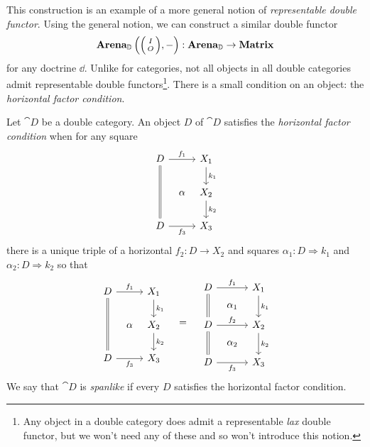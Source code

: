 \documentclass[DynamicalBook]{subfiles}
\begin{document}
This construction is an example of a more general notion of \emph{representable
  double functor}. Using the general notion, we can construct a similar double functor
$$\Cat{Arena}_{\dd}\left( \littlelens{I}{O}, - \right) : \Cat{Arena}_{\dd} \to
\Cat{Matrix}$$
for any doctrine $\dd$.
Unlike for categories, not all objects in all double
categories admit representable double functors\footnote{Any object in a double
  category does admit a representable \emph{lax} double functor, but we won't
  need any of these and so won't introduce this notion.}. There is a small
condition on an object: the \emph{horizontal factor condition}.
\begin{definition}
  Let $\cat{D}$ be a double category. An object $D$ of $\cat{D}$ satisfies the
  \emph{horizontal factor condition} when for any square 
\[
        \begin{tikzcd}[column sep=tiny]
          D \ar[dd, equals] \ar[rr, "f_1"] & & X_1 \ar[d, "k_1"] \\
           & \alpha & X_2 \ar[d, "k_2"]\\
          D \ar[rr, "f_3"'] & & X_3
        \end{tikzcd}
        \]
  there is a unique triple of a horizontal $f_2 : D \to X_2$ and squares
  $\alpha_1 : D \Rightarrow k_1$ and $\alpha_2 : D \Rightarrow k_2$ so that
\[
        \begin{tikzcd}[column sep=tiny]
          D \ar[dd, equals] \ar[rr, "f_1"] & & X_1 \ar[d, "k_1"] \\
           & \alpha & X_2 \ar[d, "k_2"]\\
          D \ar[rr, "f_3"'] & & X_3
        \end{tikzcd}
        \quad=\quad
       \begin{tikzcd}[sep = tiny]
	D && {X_1} \\
	& {\alpha_1} \\
	D && {X_2} \\
	& {\alpha_2} \\
	D && {X_3}
	\arrow[from=1-1, to=3-1, equals]
	\arrow[from=3-1, to=5-1, equals]
	\arrow["{f_1}", from=1-1, to=1-3]
	\arrow["{f_2}", from=3-1, to=3-3]
	\arrow["{f_3}"', from=5-1, to=5-3]
	\arrow["{k_1}", from=1-3, to=3-3]
	\arrow["{k_2}", from=3-3, to=5-3]
\end{tikzcd} 
\]
 We say that $\cat{D}$ is \emph{spanlike} if every $D$ satisfies the horizontal
 factor condition. 
\end{definition}
\end{document}
